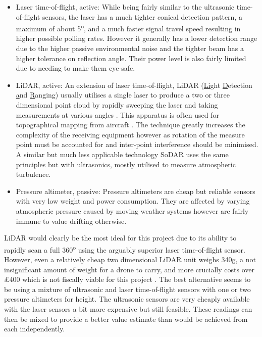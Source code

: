 \begin{itemize}
\item Laser time-of-flight, active: While being fairly similar to the ultrasonic time-of-flight sensors, the laser has a much tighter conical detection pattern, a maximum of about 5\textsuperscript{o}, and a much faster signal travel speed resulting in higher possible polling rates. However it generally has a lower detection range due to the higher passive environmental noise and the tighter beam has a higher tolerance on reflection angle. Their power level is also fairly limited due to needing to make them eye-safe.

\item LiDAR, active: An extension of laser time-of-flight, LiDAR (\underline{Li}ght \underline{D}etection \underline{a}nd \underline{R}anging) usually utilises a single laser to produce a two or three dimensional point cloud by rapidly sweeping the laser and taking measurements at various angles \cite{lidaruk2017how}\cite{cracknell2007introduction}. This apparatus is often used for topographical mapping from aircraft \cite{Nayegandhi2006green}. The technique greatly increases the complexity of the receiving equipment however as rotation of the measure point must be accounted for and inter-point interference should be minimised. A similar but much less applicable technology SoDAR uses the same principles but with ultrasonics, mostly utilised to measure atmospheric turbulence.

\item Pressure altimeter, passive: Pressure altimeters are cheap but reliable sensors with very low weight and power consumption. They are affected by varying atmospheric pressure caused by  moving weather systems however are fairly immune to value drifting otherwise.		
\end{itemize}

LiDAR would clearly be the most ideal for this project due to its ability to rapidly scan a full  360\textsuperscript{o} using the arguably superior laser time-of-flight sensor. However, even a relatively cheap two dimensional LiDAR unit weighs 340g, a not insignificant amount of weight for a drone to carry, and more crucially costs over \pounds 400 which is not fiscally viable for this project \cite{slamtec2016rplidar}. The best alternative seems to be using a mixture of ultrasonic and laser time-of-flight sensors with one or two pressure altimeters for height. The ultrasonic sensors are very cheaply available \cite{amazon2017ultrasonics} with the laser sensors a bit more expensive but still feasible. These readings can then be mixed to provide a better value estimate than would be achieved from each independently.


